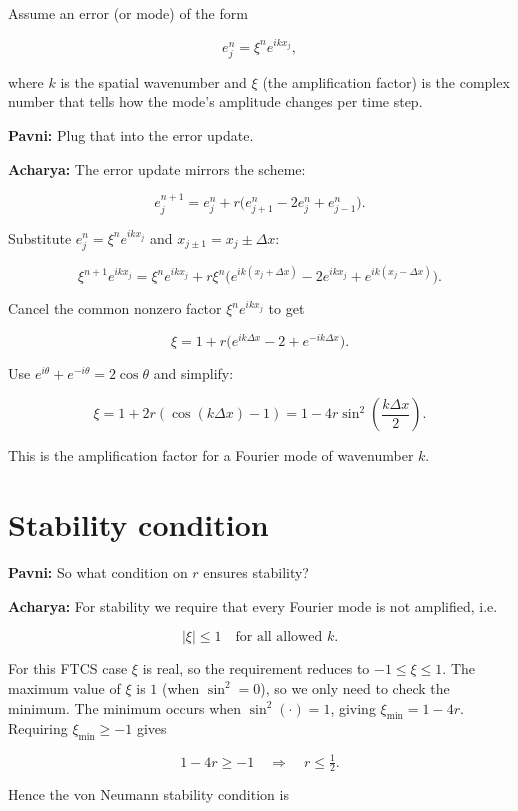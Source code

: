 \documentclass[
  letterpaper,
]{book}
\begin{document}
Assume an error (or mode) of the form

\[
e_j^n = \xi^n e^{i k x_j},
\]

where \(k\) is the spatial wavenumber and \(\xi\) (the amplification
factor) is the complex number that tells how the mode's amplitude
changes per time step.

\textbf{Pavni:} Plug that into the error update.

\textbf{Acharya:} The error update mirrors the scheme:

\[
e_j^{n+1} = e_j^n + r\big(e_{j+1}^n - 2e_j^n + e_{j-1}^n\big).
\]

Substitute \(e_j^n = \xi^n e^{i k x_j}\) and
\(x_{j\pm1} = x_j \pm \Delta x\):

\[
\xi^{n+1} e^{i k x_j} = \xi^n e^{i k x_j} + r\xi^n\big(e^{i k (x_j+\Delta x)} - 2 e^{i k x_j} + e^{i k (x_j-\Delta x)}\big).
\]

Cancel the common nonzero factor \(\xi^n e^{i k x_j}\) to get

\[
\xi = 1 + r\big(e^{i k \Delta x} - 2 + e^{-i k \Delta x}\big).
\]

Use \(e^{i\theta}+e^{-i\theta}=2\cos\theta\) and simplify:

\[
\xi = 1 + 2r(\cos(k\Delta x)-1) = 1 - 4r\sin^2\!\left(\frac{k\Delta x}{2}\right).
\]

This is the amplification factor for a Fourier mode of wavenumber \(k\).

\section{Stability condition}\label{stability-condition-3}

\textbf{Pavni:} So what condition on \(r\) ensures stability?

\textbf{Acharya:} For stability we require that every Fourier mode is
not amplified, i.e.

\[
|\xi| \le 1 \quad\text{for all allowed } k.
\]

For this FTCS case \(\xi\) is real, so the requirement reduces to
\(-1 \le \xi \le 1\). The maximum value of \(\xi\) is \(1\) (when
\(\sin^2=0\)), so we only need to check the minimum. The minimum occurs
when \(\sin^2(\cdot)=1\), giving \(\xi_{\min}=1-4r\). Requiring
\(\xi_{\min}\ge-1\) gives

\[
1-4r \ge -1 \quad\Longrightarrow\quad r \le \tfrac12.
\]

Hence the von Neumann stability condition is
\end{document}
